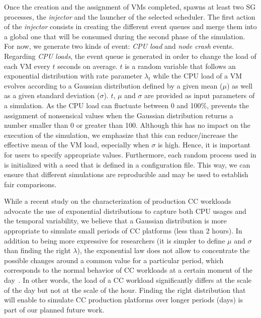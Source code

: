 Once the creation and the assignment of VMs completed, \vmps spawns at
least two SG processes, the \emph{injector} and the launcher of the
selected scheduler.  The first action of the \emph{injector} consists
in creating the different event queues and merge them into a global
one that will be consumed during the second phase of the simulation.
For now, we generate two kinds of event: \emph{CPU load} and
\emph{node crash} events.
%
Regarding \emph{CPU loads}, the event queue is generated in order to change the
load of each VM every $t$ seconds on average. $t$ is a random variable
that follows an exponential distribution with rate parameter
$\lambda_t$ while the CPU load of a VM evolves according to a Gaussian
distribution defined by a given mean ($\mu$) as well as a given
standard deviation ($\sigma$). $t$, $\mu$ and $\sigma$ are provided as
input parameters of a simulation. As the CPU load can fluctuate
between 0 and 100\%, \vmps prevents the assignment of nonsensical
values when the Gaussian distribution returns a number smaller than 0
or greater than 100. Although this has no impact on the execution of
the simulation, we emphasize that this can reduce/increase the
effective mean of the VM load, especially when $\sigma$ is high.
Hence, it is important for users to specify appropriate values.
Furthermore, each random process used in \vmps is initialized with a
seed that is defined in a configuration file. This way, we can ensure
that different simulations are reproducible and may be used to
establish fair comparisons.

While a recent study on the characterization of production CC
workloads~\cite{birke:nom2014} advocate the use of exponential
distributions to capture both CPU usages and the temporal variability,
we believe that a Gaussian distribution is more appropriate to simulate small periods of CC
platforms (\ie less than 2 hours). In addition to being more expressive for
researchers (\ie it is simpler to define $\mu$ and $\sigma$ than
finding the right $\lambda$), the exponential law does not allow \vmps
to concentrate the possible changes around a common value for a
particular period, which corresponds to the normal behavior of CC
workloads at a certain moment of the day~\cite{shen:ccgrid2015}. In
other words, the load of a CC workload significantly differs at the
scale of the day but not at the scale of the hour. Finding the right
distribution that will enable \vmps to simulate CC production
platforms over longer periods (\ie days) is part of our planned future
work.

